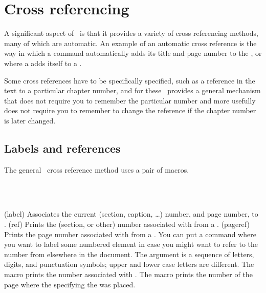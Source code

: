 


\chapter{Cross referencing} \label{chap:xref}


    A significant aspect of \ltx\ is that it provides a variety of
cross referencing methods, many of 
which are automatic. An example
of an automatic cross reference is the way in which a \cmd{\chapter}
command automatically adds its title and page number to the \toc,
or where a \cmd{\caption} adds itself to a \listofx.

    Some cross references have to be 
specifically specified, such as
a reference in the text to a particular chapter number, and for
these \ltx\ provides a general mechanism that does not require you
to remember the particular number and more usefully does not require
you to remember to change the reference if the chapter number is later 
changed.

\section{Labels and references} \label{sec:lab&ref}


    The general \ltx\ cross reference method uses a pair of macros.
\begin{syntax}
\cmd{\label} \\
 \cmd{\ref} \cmd{\pageref} \\
\end{syntax}
\glossary(label)%
  {}%
  {Associates the current (section, caption, \ldots) number, and page number,
   to .}
\glossary(ref)%
  {}%
  {Prints the (section, or other) number associated with 
   from a .}
\glossary(pageref)%
  {}%
  {Prints the page number associated with 
   from a .}
You can put a \cmd{\label} command where you want to label 
some numbered
element in case you might want to refer to the number from elsewhere in
the document. The  argument is a sequence of letters, digits, 
and punctuation symbols; upper and lower case letters are different.
The \cmd{\ref} macro prints the number 
associated with . 
The \cmd{\pageref} macro prints the number of the 
page where the
\cmd{\label} specifying the  was placed.

